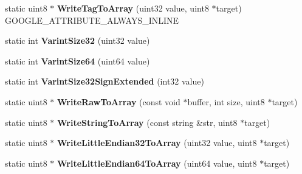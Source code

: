 \begin{DoxyCompactItemize}
static uint8 $\ast$ {\bfseries Write\+Tag\+To\+Array} (uint32 value, uint8 $\ast$target) G\+O\+O\+G\+L\+E\+\_\+\+A\+T\+T\+R\+I\+B\+U\+T\+E\+\_\+\+A\+L\+W\+A\+Y\+S\+\_\+\+I\+N\+L\+I\+NE
\item 
\mbox{\label{classgoogle_1_1protobuf_1_1io_1_1CodedOutputStream_a8efaa478faa8f95e6681493abb18d76b}} 
static int {\bfseries Varint\+Size32} (uint32 value)
\item 
\mbox{\label{classgoogle_1_1protobuf_1_1io_1_1CodedOutputStream_a469a9549781f3be91fa3a4ccac4384ee}} 
static int {\bfseries Varint\+Size64} (uint64 value)
\item 
\mbox{\label{classgoogle_1_1protobuf_1_1io_1_1CodedOutputStream_ae3da3783accc6cf6dd2d34d1762c1195}} 
static int {\bfseries Varint\+Size32\+Sign\+Extended} (int32 value)
\item 
\mbox{\label{classgoogle_1_1protobuf_1_1io_1_1CodedOutputStream_af2d89add8626cf37d643ee4392b11c47}} 
static uint8 $\ast$ {\bfseries Write\+Raw\+To\+Array} (const void $\ast$buffer, int size, uint8 $\ast$target)
\item 
\mbox{\label{classgoogle_1_1protobuf_1_1io_1_1CodedOutputStream_a7e3b433581944d0427c21e3abe28a44c}} 
static uint8 $\ast$ {\bfseries Write\+String\+To\+Array} (const string \&str, uint8 $\ast$target)
\item 
\mbox{\label{classgoogle_1_1protobuf_1_1io_1_1CodedOutputStream_aeb8ac7500deddd76500c316a8fc27e02}} 
static uint8 $\ast$ {\bfseries Write\+Little\+Endian32\+To\+Array} (uint32 value, uint8 $\ast$target)
\item 
\mbox{\label{classgoogle_1_1protobuf_1_1io_1_1CodedOutputStream_a913a9a25d8c9950e9d4a984b112da9cd}} 
static uint8 $\ast$ {\bfseries Write\+Little\+Endian64\+To\+Array} (uint64 value, uint8 $\ast$target)
\item 
\mbox{\label{classgoogle_1_1protobuf_1_1io_1_1CodedOutputStream_a6bda1e437ddeaf9ca3fce597fde504ed}} 

\end{DoxyCompactItemize}
